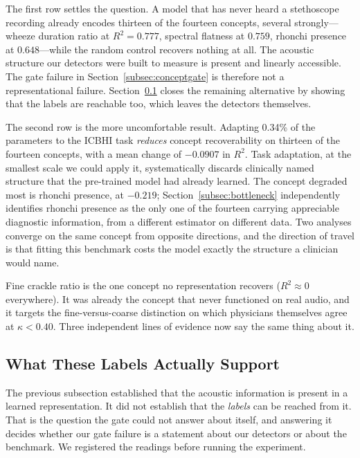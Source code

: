 \documentclass[journal,onecolumn]{IEEEtran}
\begin{document}
The first row settles the question. A model that has never heard a stethoscope
recording already encodes thirteen of the fourteen concepts, several strongly---wheeze
duration ratio at $R^2=0.777$, spectral flatness at $0.759$, rhonchi presence at
$0.648$---while the random control recovers nothing at all. The acoustic structure our
detectors were built to measure is present and linearly accessible. The gate failure in
Section~\ref{subsec:conceptgate} is therefore not a representational failure.
Section~\ref{subsec:ceiling} closes the remaining alternative by showing that the labels
are reachable too, which leaves the detectors themselves.

The second row is the more uncomfortable result. Adapting 0.34\% of the parameters to
the ICBHI task \emph{reduces} concept recoverability on thirteen of the fourteen
concepts, with a mean change of $-0.0907$ in $R^2$. Task adaptation, at the smallest
scale we could apply it, systematically discards clinically named structure that the
pre-trained model had already learned. The concept degraded most is rhonchi presence,
at $-0.219$; Section~\ref{subsec:bottleneck} independently identifies rhonchi presence
as the only one of the fourteen carrying appreciable diagnostic information, from a
different estimator on different data. Two analyses converge on the same concept from
opposite directions, and the direction of travel is that fitting this benchmark costs
the model exactly the structure a clinician would name.

Fine crackle ratio is the one concept no representation recovers ($R^2 \approx 0$
everywhere). It was already the concept that never functioned on real audio, and it
targets the fine-versus-coarse distinction on which physicians themselves agree at
$\kappa<0.40$. Three independent lines of evidence now say the same thing about it.

\subsection{What These Labels Actually Support}
\label{subsec:ceiling}

The previous subsection established that the acoustic information is present in a
learned representation. It did not establish that the \emph{labels} can be reached from
it. That is the question the gate could not answer about itself, and answering it
decides whether our gate failure is a statement about our detectors or about the
benchmark. We registered the readings before running the experiment.
\end{document}

